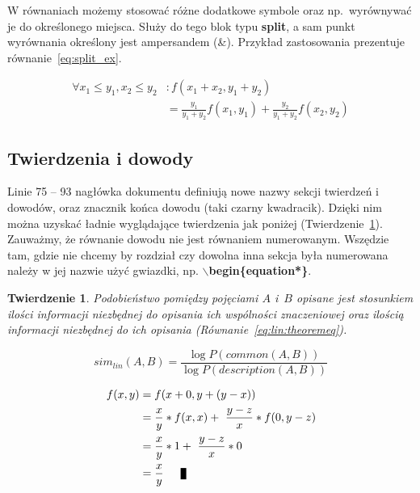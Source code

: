 \documentclass[twoside,a4paper]{book}
\newtheorem{theorem}{Twierdzenie}[section]
\newenvironment{proof}[1][Dowód]{\begin{trivlist}
\item[\hskip \labelsep {\bfseries #1}]}{\end{trivlist}}
\newcommand{\qed}{\nobreak \ifvmode \relax \else
      \ifdim\lastskip<1.5em \hskip-\lastskip
      \hskip1.5em plus0em minus0.5em \fi \nobreak
      \vrule height0.75em width0.5em depth0.25em\fi}
\begin{document}
W równaniach możemy stosować różne dodatkowe symbole oraz np.\ wyrównywać je do określonego miejsca. Służy do tego blok typu \textbf{split}, a sam punkt wyrównania określony jest ampersandem (\&). Przykład zastosowania prezentuje równanie~\ref{eq:split_ex}.

\begin{equation}
  \label{eq:split_ex}
  \begin{split}
    \forall {x_1 \leq y_1, x_2 \leq y_2}&: f(x_1+x_2,y_1+y_2)\\ 
				  &= \frac{y_1}{y_1+y_2}f(x_1,y_1)+\frac{y_2}{y_1+y_2}f(x_2,y_2)
  \end{split}
\end{equation}

\subsection{Twierdzenia i dowody}

Linie 75 -- 93 nagłówka dokumentu definiują nowe nazwy sekcji twierdzeń i dowodów, oraz znacznik końca dowodu (taki czarny kwadracik). Dzięki nim można uzyskać ładnie wyglądające twierdzenia jak poniżej (Twierdzenie~\ref{eq:lin:theorem}). Zauważmy, że równanie dowodu nie jest równaniem numerowanym. Wszędzie tam, gdzie nie chcemy by rozdział czy dowolna inna sekcja była numerowana należy w jej nazwie użyć gwiazdki, np. \textbf{$\backslash$begin\{equation*\}}.

\begin{theorem}
 Podobieństwo pomiędzy pojęciami $A$ i~$B$ opisane jest stosunkiem ilości informacji niezbędnej do opisania ich wspólności znaczeniowej oraz ilością informacji niezbędnej do ich opisania (Równanie~\ref{eq:lin:theoremeq}).

 \begin{equation}
   sim_{lin}(A,B)=\frac{\log P(common(A,B))}{\log P(description(A,B))}
   \label{eq:lin:theoremeq}
 \end{equation}
 \label{eq:lin:theorem}
\end{theorem}

\begin{proof}
  \begin{equation*}
   \begin{split}
     f(x,y)&=f(x+0,y+(y-x))\\
	   &=\frac{x}{y}*f(x,x) +~\frac{y-z}{x}*f(0,y-z)\\
	   &=\frac{x}{y}*1 +~\frac{y-z}{x}*0\\
	   &=\frac{x}{y} \qed
   \end{split}
 \end{equation*}
\end{proof}
\end{document}
